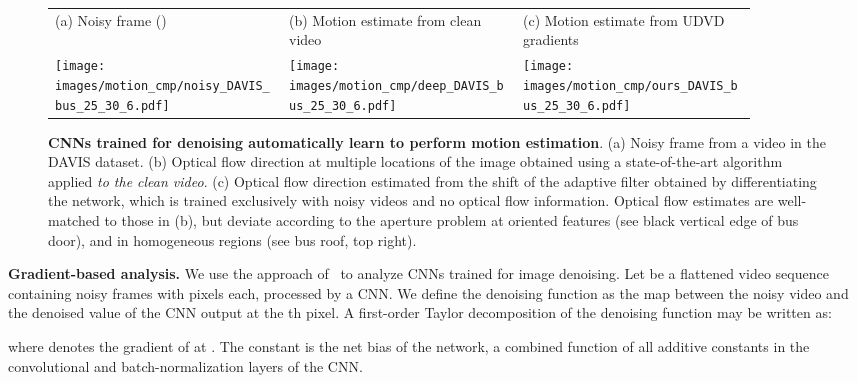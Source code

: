 \documentclass[final]{cvpr}
\begin{document}
\begin{figure*}[ht]
    \def\f1ht{\linewidth}\centering 
    \begin{tabular}{ >{\centering\arraybackslash}m{0.3\linewidth}
     >{\centering\arraybackslash}m{0.3\linewidth}
     >{\centering\arraybackslash}m{0.3\linewidth} }
     \centering
     
      \hspace{4mm}  \footnotesize{(a) Noisy frame ()} &   \footnotesize{(b) Motion estimate from clean video} 
      &  \footnotesize{(c) Motion estimate from UDVD gradients}  \\
      
      \texttt{[image: images/motion\_cmp/noisy\_DAVIS\_bus\_25\_30\_6.pdf]} &
      \texttt{[image: images/motion\_cmp/deep\_DAVIS\_bus\_25\_30\_6.pdf]} &
      \texttt{[image: images/motion\_cmp/ours\_DAVIS\_bus\_25\_30\_6.pdf]} \\
    
     \end{tabular}
     \vspace{0.3cm}
     \caption{\textbf{CNNs trained for denoising automatically learn to perform motion estimation}. (a) Noisy frame from a video in the DAVIS dataset. (b) Optical flow direction at multiple locations of the image obtained using a state-of-the-art algorithm applied \emph{to the clean video}. (c) Optical flow direction estimated from the shift of the adaptive filter obtained by differentiating the network, which is trained exclusively with noisy videos and no optical flow information. Optical flow estimates are well-matched to those in (b), but deviate according to the aperture problem at oriented features (see black vertical edge of bus door), and in homogeneous regions (see bus roof, top right). }
\label{fig:optical_flow}

\end{figure*}

\noindent \textbf{Gradient-based analysis.} We use the approach of~\cite{biasfree} to analyze CNNs trained for image denoising. Let  be a flattened video sequence containing  noisy frames with  pixels each, processed by a CNN. We define the denoising function  as the map between the noisy video and the denoised value  of the CNN output at the th pixel. A first-order Taylor decomposition of the denoising function may be written as:

where  denotes the gradient of  at . The constant  is the net bias of the network, a combined function of all additive constants in the convolutional and batch-normalization layers of the CNN.
\end{document}
